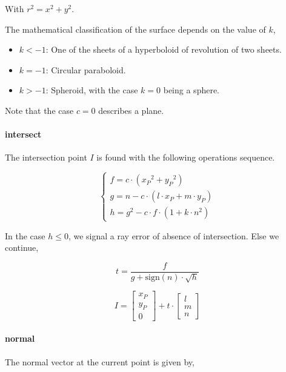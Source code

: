 With $r^2 = x^2 + y^2$.

The mathematical classification of the surface depends on the value of
$k$,

\begin{itemize}
\item $k < -1$: One of the sheets of a hyperboloid of revolution of two sheets.
\item $k = -1$: Circular paraboloid.
\item $k > -1$: Spheroid, with the case $k=0$ being a sphere.
\end{itemize}

Note that the case $c=0$ describes a plane.

\paragraph{intersect}
The intersection point $I$ is found with the following operations sequence.

\begin{equation} \begin{cases}
f = c \cdot ({x_P}^2 + {y_P}^2) \\
g = n - c \cdot (l \cdot x_P + m \cdot y_P) \\
h = g^2 - c \cdot f \cdot (1 + k \cdot n^2)
\end{cases} \end{equation}

In the case $h \leq 0$, we signal a ray error of absence of intersection.
Else we continue,

\begin{equation}
t = \frac{f}{g + \textrm{sign}(n) \cdot \sqrt{h}}
\end{equation}

\begin{equation}
I = \begin{bmatrix} x_P \\ y_P \\ 0 \end{bmatrix} + t \cdot
    \begin{bmatrix} l \\ m \\ n \end{bmatrix}
\end{equation}

\paragraph{normal}
The normal vector at the current point is given by,

